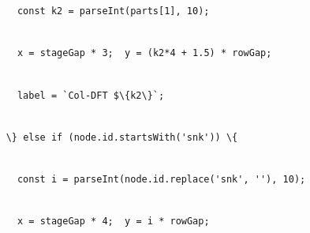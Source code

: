 \documentclass[
]{article}
\newcommand{\passthrough}[1]{#1}
\begin{document}
\passthrough{\lstinline!      !}\passthrough{\lstinline!const!}\passthrough{\lstinline! !}\passthrough{\lstinline!k2!}\passthrough{\lstinline! !}\passthrough{\lstinline!=!}\passthrough{\lstinline! !}\passthrough{\lstinline!parseInt!}\passthrough{\lstinline!(parts[1],!}\passthrough{\lstinline! !}\passthrough{\lstinline!10);!}\strut \\
\passthrough{\lstinline!      !}\passthrough{\lstinline!x!}\passthrough{\lstinline! !}\passthrough{\lstinline!=!}\passthrough{\lstinline! !}\passthrough{\lstinline!stageGap!}\passthrough{\lstinline! !}\passthrough{\lstinline!*!}\passthrough{\lstinline! !}\passthrough{\lstinline!3;!}\passthrough{\lstinline!  !}\passthrough{\lstinline!y!}\passthrough{\lstinline! !}\passthrough{\lstinline!=!}\passthrough{\lstinline! !}\passthrough{\lstinline!(k2*4!}\passthrough{\lstinline! !}\passthrough{\lstinline!+!}\passthrough{\lstinline! !}\passthrough{\lstinline!1.5)!}\passthrough{\lstinline! !}\passthrough{\lstinline!*!}\passthrough{\lstinline! !}\passthrough{\lstinline!rowGap!}\passthrough{\lstinline!;!}\strut \\
\passthrough{\lstinline!      !}\passthrough{\lstinline!label!}\passthrough{\lstinline! !}\passthrough{\lstinline!=!}\passthrough{\lstinline! !}\passthrough{\lstinline!`Col-DFT!}\passthrough{\lstinline! !}\passthrough{\lstinline!$\{k2\}`;!}\strut \\
\passthrough{\lstinline!    !}\passthrough{\lstinline!\}!}\passthrough{\lstinline! !}\passthrough{\lstinline!else!}\passthrough{\lstinline! !}\passthrough{\lstinline!if!}\passthrough{\lstinline! !}\passthrough{\lstinline!(!}\passthrough{\lstinline!node.id.startsWith!}\passthrough{\lstinline!('!}\passthrough{\lstinline!snk!}\passthrough{\lstinline!'))!}\passthrough{\lstinline! !}\passthrough{\lstinline!\{!}\strut \\
\passthrough{\lstinline!      !}\passthrough{\lstinline!const!}\passthrough{\lstinline! !}\passthrough{\lstinline!i!}\passthrough{\lstinline! !}\passthrough{\lstinline!=!}\passthrough{\lstinline! !}\passthrough{\lstinline!parseInt!}\passthrough{\lstinline!(!}\passthrough{\lstinline!node.id.replace!}\passthrough{\lstinline!('!}\passthrough{\lstinline!snk!}\passthrough{\lstinline!',!}\passthrough{\lstinline! !}\passthrough{\lstinline!''),!}\passthrough{\lstinline! !}\passthrough{\lstinline!10);!}\strut \\
\passthrough{\lstinline!      !}\passthrough{\lstinline!x!}\passthrough{\lstinline! !}\passthrough{\lstinline!=!}\passthrough{\lstinline! !}\passthrough{\lstinline!stageGap!}\passthrough{\lstinline! !}\passthrough{\lstinline!*!}\passthrough{\lstinline! !}\passthrough{\lstinline!4;!}\passthrough{\lstinline!  !}\passthrough{\lstinline!y!}\passthrough{\lstinline! !}\passthrough{\lstinline!=!}\passthrough{\lstinline! !}\passthrough{\lstinline!i!}\passthrough{\lstinline! !}\passthrough{\lstinline!*!}\passthrough{\lstinline! !}\passthrough{\lstinline!rowGap!}\passthrough{\lstinline!;!}\strut \\
\end{document}
